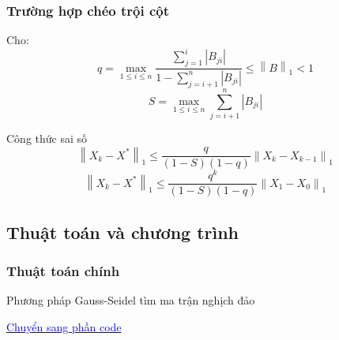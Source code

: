     \begin{frame}
        \frametitle{Trường hợp chéo trội cột}
        Cho: 
        $$ q = \max\limits_{1 \leq i \leq n} \frac{\sum\limits_{j=1}^{i} \left\lvert B_{ji} \right\rvert}{1 - \sum\limits_{j=i+1}^{n} \left\lvert B_{ji} \right\rvert} \leq \left\lVert B \right\rVert_{1} < 1 $$ 
        $$ S = \max\limits_{1 \leq i \leq n} \sum\limits_{j=i+1}^{n} \left\lvert B_{ji} \right\rvert $$
        
        \begin{block}{Công thức sai số\cite{giaotrinhgiaitichso}}
            $$ \left\lVert X_{k} - X^{*} \right\rVert_{1} \leq \frac{q}{(1 - S)(1 - q)} \left\lVert X_{k} - X_{k - 1} \right\rVert_{1}  $$
            $$ \left\lVert X_{k} - X^{*} \right\rVert_{1} \leq \frac{q^{k}}{(1 - S)(1 - q)} \left\lVert X_{1} - X_{0} \right\rVert_{1}  $$
        \end{block}
    \end{frame}

\subsection{Thuật toán và chương trình}
    \begin{frame}[fragile, label = gauss_seidel.algo]  
        \frametitle{Thuật toán chính}
        \IncMargin{1em}\begin{algorithm}[H]
            \caption{Phương pháp Gauss-Seidel tìm ma trận nghịch đảo \label{IR}}
            \SetAlgoLined   
        \end{algorithm}\DecMargin{1em}
        \hyperlink{gauss_seidel.code}{\textcolor{blue}{Chuyển sang phần code}}
    \end{frame}

